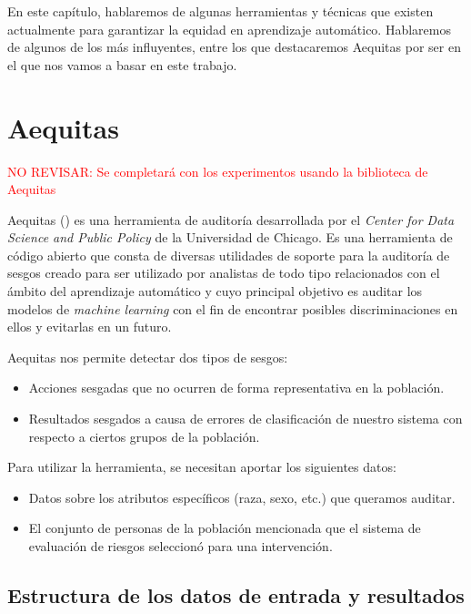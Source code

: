 En este capítulo, hablaremos de algunas herramientas y técnicas que existen actualmente para garantizar la equidad en aprendizaje automático. Hablaremos de algunos de los más influyentes, entre los que destacaremos Aequitas por ser en el que nos vamos a basar en este trabajo. 

\section{Aequitas}

\textcolor{red}{NO REVISAR: Se completará con los experimentos usando la biblioteca de Aequitas}

Aequitas (\cite{aequitas2019}) es una herramienta de auditoría desarrollada por el \textit{Center for Data Science and Public Policy} de la
Universidad de Chicago. Es una herramienta de código abierto que consta de diversas utilidades de soporte para la auditoría de sesgos creado para ser utilizado por analistas de todo tipo relacionados con el ámbito del aprendizaje automático y cuyo principal objetivo es auditar los modelos de \textit{machine learning} con el fin de encontrar posibles discriminaciones en ellos y evitarlas en un futuro.

Aequitas nos permite detectar dos tipos de sesgos:

\begin{itemize}
    \item Acciones sesgadas que no ocurren de forma representativa en la población.
    \item Resultados sesgados a causa de errores de clasificación de nuestro sistema con respecto a ciertos grupos de la población.
\end{itemize}

Para utilizar la herramienta, se necesitan aportar los siguientes datos:

\begin{itemize}
    \item Datos sobre los atributos específicos (raza, sexo, etc.) que queramos auditar.
    \item El conjunto de personas de la población mencionada que el sistema de evaluación de riesgos seleccionó para una intervención.
\end{itemize}

\subsection{Estructura de los datos de entrada y resultados}

